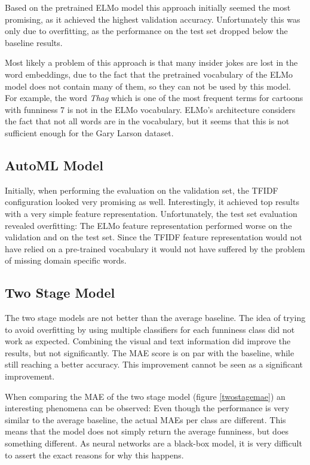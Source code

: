 \documentclass[draft,final,oneside]{vutinfth} %
\begin{document}
Based on the pretrained ELMo model this approach initially seemed the most promising, as it achieved the highest validation accuracy. Unfortunately this was only due to overfitting, as the performance on the test set dropped below the baseline results.

Most likely a problem of this approach is that many insider jokes are lost in the word embeddings, due to the fact that the pretrained vocabulary of the ELMo model does not contain many of them, so they can not be used by this model. For example, the word \textit{Thag} which is one of the most frequent terms for cartoons with funniness 7 is not in the ELMo vocabulary. ELMo's architecture considers the fact that not all words are in the vocabulary, but it seems that this is not sufficient enough for the Gary Larson dataset. 

\subsection{AutoML Model}
Initially, when performing the evaluation on the validation set, the TFIDF configuration looked very promising as well. Interestingly, it achieved top results with a very simple feature representation. Unfortunately, the test set evaluation revealed overfitting: The ELMo feature representation performed worse on the validation and on the test set. Since the TFIDF feature representation would not have relied on a pre-trained vocabulary it would not have suffered by the problem of missing domain specific words.

\subsection{Two Stage Model}
The two stage models are not better than the average baseline. The idea of trying to avoid overfitting by using multiple classifiers for each funniness class did not work as expected. Combining the visual and text information did improve the results, but not significantly. The MAE score is on par with the baseline, while still reaching a better accuracy. This improvement cannot be seen as a significant improvement.

\pagebreak
When comparing the MAE of the two stage model (figure \ref{twostagemae}) an interesting phenomena can be observed: Even though the performance is very similar to the average baseline, the actual MAEs per class are different. This means that the model does not simply return the average funniness, but does something different. As neural networks are a black-box model, it is very difficult to assert the exact reasons for why this happens.
\end{document}
